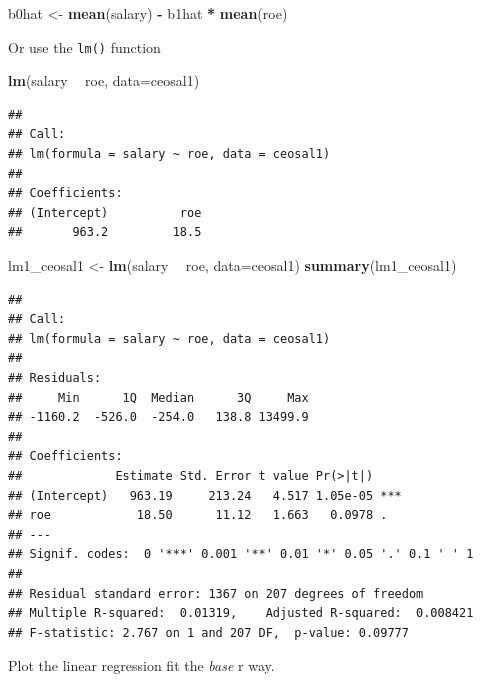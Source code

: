 \documentclass[]{book}
\newenvironment{Shaded}{\begin{snugshade}}{\end{snugshade}}
\newcommand{\DataTypeTok}[1]{\textcolor[rgb]{0.13,0.29,0.53}{#1}}
\newcommand{\KeywordTok}[1]{\textcolor[rgb]{0.13,0.29,0.53}{\textbf{#1}}}
\newcommand{\NormalTok}[1]{#1}
\newcommand{\OperatorTok}[1]{\textcolor[rgb]{0.81,0.36,0.00}{\textbf{#1}}}
\newcommand{\StringTok}[1]{\textcolor[rgb]{0.31,0.60,0.02}{#1}}
\begin{document}
\begin{Shaded}
\begin{Highlighting}[]
\NormalTok{b0hat <-}\StringTok{ }\KeywordTok{mean}\NormalTok{(salary) }\OperatorTok{-}\StringTok{ }\NormalTok{b1hat }\OperatorTok{*}\StringTok{ }\KeywordTok{mean}\NormalTok{(roe)}
\end{Highlighting}
\end{Shaded}

Or use the \texttt{lm()} function

\begin{Shaded}
\begin{Highlighting}[]
\KeywordTok{lm}\NormalTok{(salary }\OperatorTok{~}\StringTok{ }\NormalTok{roe, }\DataTypeTok{data=}\NormalTok{ceosal1)}
\end{Highlighting}
\end{Shaded}

\begin{verbatim}
## 
## Call:
## lm(formula = salary ~ roe, data = ceosal1)
## 
## Coefficients:
## (Intercept)          roe  
##       963.2         18.5
\end{verbatim}

\begin{Shaded}
\begin{Highlighting}[]
\NormalTok{lm1_ceosal1 <-}\StringTok{ }\KeywordTok{lm}\NormalTok{(salary }\OperatorTok{~}\StringTok{ }\NormalTok{roe, }\DataTypeTok{data=}\NormalTok{ceosal1) }
\KeywordTok{summary}\NormalTok{(lm1_ceosal1)}
\end{Highlighting}
\end{Shaded}

\begin{verbatim}
## 
## Call:
## lm(formula = salary ~ roe, data = ceosal1)
## 
## Residuals:
##     Min      1Q  Median      3Q     Max 
## -1160.2  -526.0  -254.0   138.8 13499.9 
## 
## Coefficients:
##             Estimate Std. Error t value Pr(>|t|)    
## (Intercept)   963.19     213.24   4.517 1.05e-05 ***
## roe            18.50      11.12   1.663   0.0978 .  
## ---
## Signif. codes:  0 '***' 0.001 '**' 0.01 '*' 0.05 '.' 0.1 ' ' 1
## 
## Residual standard error: 1367 on 207 degrees of freedom
## Multiple R-squared:  0.01319,    Adjusted R-squared:  0.008421 
## F-statistic: 2.767 on 1 and 207 DF,  p-value: 0.09777
\end{verbatim}

Plot the linear regression fit the \emph{base} r way.
\end{document}
